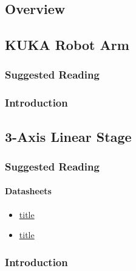 \subsection{Overview}





\subsection{KUKA Robot Arm}

\subsubsection{Suggested Reading}

\subsubsection{Introduction}











\subsection{3-Axis Linear Stage}


\subsubsection{Suggested Reading}

\paragraph{Datasheets}

\begin{itemize}

    \item \href{link}{title}
    
    \item \href{link}{title}

\end{itemize} 



\subsubsection{Introduction}

